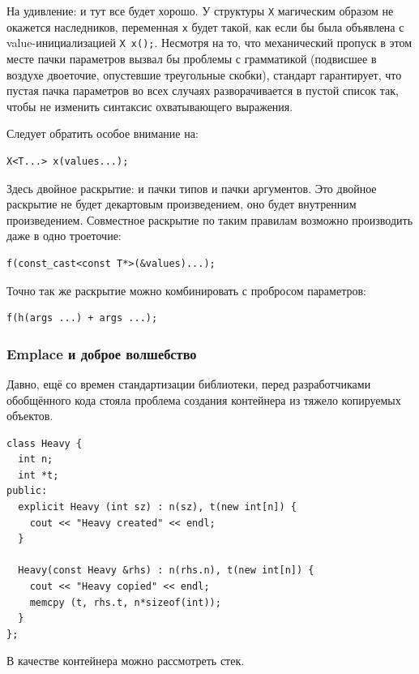 \documentclass[a4paper,12pt,oneside]{article}
\begin{document}
На удивление: и тут все будет хорошо. У структуры \lstinline!X! магическим образом не окажется наследников, переменная \lstinline!x! будет такой, как если бы была объявлена с value-инициализацией \lstinline!X x();!. Несмотря на то, что механический пропуск в этом месте пачки параметров вызвал бы проблемы с грамматикой (подвисшее в воздухе двоеточие, опустевшие треугольные скобки), стандарт гарантирует, что пустая пачка параметров во всех случаях разворачивается в пустой список так, чтобы не изменить синтаксис охватывающего выражения.

Следует обратить особое внимание на:

\begin{lstlisting}
X<T...> x(values...);
\end{lstlisting}

Здесь двойное раскрытие: и пачки типов и пачки аргументов. Это двойное раскрытие не будет декартовым произведением, оно будет внутренним произведением. Совместное раскрытие по таким правилам возможно производить даже в одно троеточие:

\begin{lstlisting}
f(const_cast<const T*>(&values)...); 
\end{lstlisting}

Точно так же раскрытие можно комбинировать с пробросом параметров:

\begin{lstlisting}
f(h(args ...) + args ...);
\end{lstlisting}

\subsubsection{Emplace и доброе волшебство}\label{subsub:Emplace}

Давно, ещё со времен стандартизации библиотеки, перед разработчиками обобщённого кода стояла проблема создания контейнера из тяжело копируемых объектов.

\begin{lstlisting}
class Heavy {
  int n;
  int *t;
public:
  explicit Heavy (int sz) : n(sz), t(new int[n]) {
    cout << "Heavy created" << endl;
  }

  Heavy(const Heavy &rhs) : n(rhs.n), t(new int[n]) {
    cout << "Heavy copied" << endl;
    memcpy (t, rhs.t, n*sizeof(int));
  }
};
\end{lstlisting}

В качестве контейнера можно рассмотреть стек.
\end{document}
